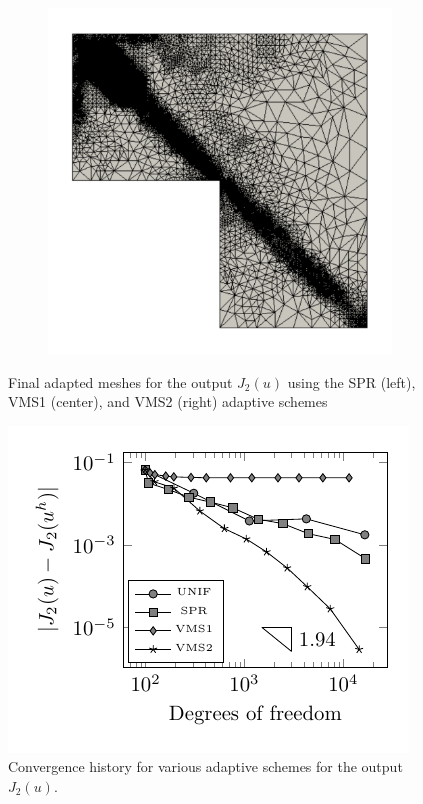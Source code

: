 \begin{figure}[hbt!]
\begin{subfigure}{.3\textwidth}
\end{subfigure}%
\begin{subfigure}{.3\textwidth}
\centering
\includegraphics[width=.99\linewidth]{img/vms_lshape_square_vms2_final}
\end{subfigure}
\caption{Final adapted meshes for the output $J_2(u)$ using
the SPR (left), VMS1 (center), and VMS2 (right) adaptive schemes}
\label{fig:J2_meshes}
\end{figure}

\begin{figure}[hbt!]
\centering
\includegraphics[width=.5\linewidth]{img/vms_lshape_square_convergence}
\caption{Convergence history for various adaptive schemes for
the output $J_2(u)$.}
\label{fig:J2_convergence}
\end{figure}

